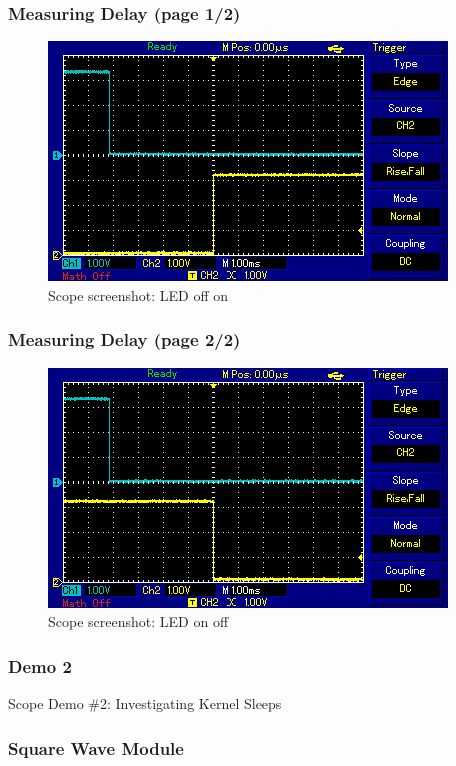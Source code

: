 \begin{frame}
  \frametitle{Measuring Delay (page 1/2)}
  \begin{figure}
    \centering
    \includegraphics[scale=0.75]{images/scope-trace-delay1.png}
    \caption{Scope screenshot: LED off \textrightarrow{} on}
  \end{figure}
\end{frame}

\begin{frame}
  \frametitle{Measuring Delay (page 2/2)}
  \begin{figure}
    \centering
    \includegraphics[scale=0.75]{images/scope-trace-delay2.png}
    \caption{Scope screenshot: LED on \textrightarrow{} off}
  \end{figure}
\end{frame}

\begin{frame}[standout]
  \frametitle{Demo 2}
  Scope Demo \#2: Investigating Kernel Sleeps
\end{frame}

\begin{frame}[containsverbatim,allowframebreaks=1]
  \frametitle{Square Wave Module}
  
\end{frame}

